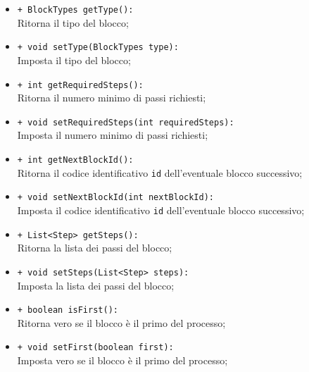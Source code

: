 \begin{flushleft}
\begin{itemize}
\begin{sloppypar}
\begin{itemize}
\item \texttt{+ BlockTypes getType():}\\ Ritorna il tipo del blocco;
\item \texttt{+ void setType(BlockTypes type):}\\ Imposta il tipo del blocco;
\item \texttt{+ int getRequiredSteps():}\\ Ritorna il numero minimo di passi richiesti;
\item \texttt{+ void setRequiredSteps(int requiredSteps):}\\ Imposta il numero minimo di passi richiesti;
\item \texttt{+ int getNextBlockId():}\\ Ritorna il codice identificativo \texttt{id} dell'eventuale blocco successivo;
\item \texttt{+ void setNextBlockId(int nextBlockId):}\\ Imposta il codice identificativo \texttt{id} dell'eventuale blocco successivo;
\item \texttt{+ List<Step> getSteps():}\\ Ritorna la lista dei passi del blocco;
\item \texttt{+ void setSteps(List<Step> steps):}\\ Imposta la lista dei passi del blocco;
\item \texttt{+ boolean isFirst():}\\ Ritorna vero se il blocco è il primo del processo;
\item \texttt{+ void setFirst(boolean first):}\\ Imposta vero se il blocco è il primo del processo;
\end{itemize}
\end{sloppypar}
\end{itemize}
\end{flushleft}

